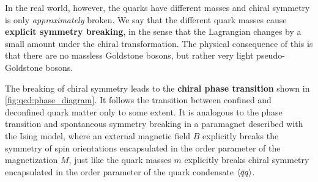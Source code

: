 In the real world, however, the quarks have different masses and chiral symmetry is only \emph{approximately} broken.
We say that the different quark masses cause \textbf{explicit symmetry breaking}, in the sense that the Lagrangian changes by a small amount under the chiral transformation.
The physical consequence of this is that there are no massless Goldstone bosons, but rather very light pseudo-Goldstone bosons.

The breaking of chiral symmetry leads to the \textbf{chiral phase transition} shown in \cref{fig:qcd:phase_diagram}.
It follows the transition between confined and deconfined quark matter only to some extent. 
It is analogous to the phase transition and spontaneous symmetry breaking in a paramagnet described with the Ising model,
where an external magnetic field $B$ explicitly breaks the symmetry of spin orientations encapsulated in the order parameter of the magnetization $M$,
just like the quark masses $m$ explicitly breaks chiral symmetry encapsulated in the order parameter of the quark condensate $\langle \bar{q} q \rangle$.
